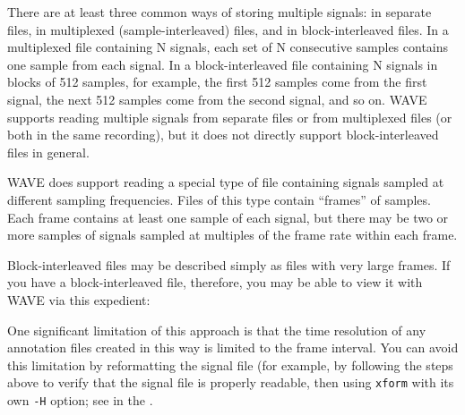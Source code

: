 \documentclass[twoside]{book}
\newcommand{\WAVE}{{\sf WAVE}\xspace}
\begin{document}
There are at least three common ways of storing multiple signals: in
separate files, in multiplexed (sample-interleaved) files, and in
block-interleaved files.  In a multiplexed file containing N signals,
each set of N consecutive samples contains one sample from each
signal.  In a block-interleaved file containing N signals in blocks of
512 samples, for example, the first 512 samples come from the first
signal, the next 512 samples come from the second signal, and so on.
\WAVE{} supports reading multiple signals from separate files or from
multiplexed files (or both in the same recording), but it does not
directly support block-interleaved files in general.

\WAVE{} does support reading a special type of file containing signals
sampled at different sampling frequencies.  Files of this type contain
``frames'' of samples.  Each frame contains at least one sample of
each signal, but there may be two or more samples of signals sampled
at multiples of the frame rate within each frame.

Block-interleaved files may be described simply as files with very
large frames.  If you have a block-interleaved file, therefore, you
may be able to view it with \WAVE{} via this expedient:


One significant limitation of this approach is that the time
resolution of any annotation files created in this way is limited to
the frame interval.  You can avoid this limitation by reformatting the
signal file (for example, by following the steps above to verify that
the signal file is properly readable, then using {\tt xform} with its
own {\tt -H} option; see
in the
.
\end{document}
